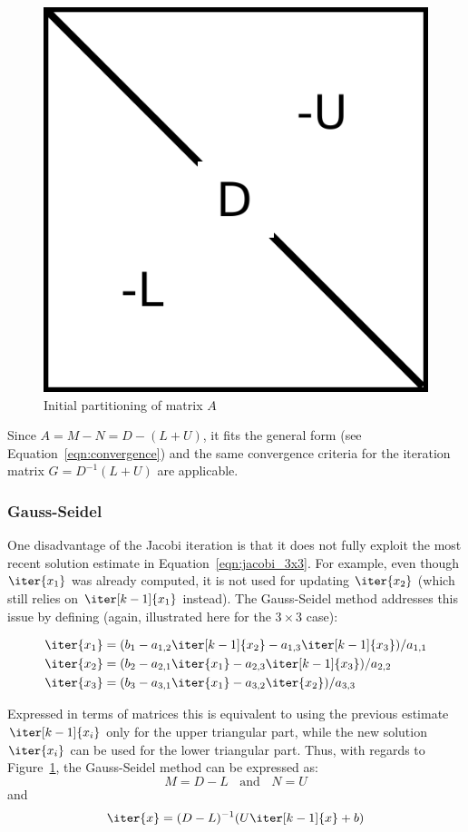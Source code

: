 \begin{figure}[h]
    \centering
    \includegraphics[width=0.4\linewidth]{chapters/3_solvers/3_2_iterative_solvers/figures/Splitting.pdf}
    \caption{Initial partitioning of matrix $A$}
    \label{fig:splitting}
\end{figure}

\noindent Since $A = M -N = D - (L +U)$, it fits the general form (see Equation~\hyperref[eqn:convergence]{\ref{eqn:convergence}}) and the same convergence criteria for the iteration matrix $G=D^{-1}(L+U)$ are applicable.

\subsubsection{Gauss-Seidel}
One disadvantage of the Jacobi iteration is that it does not fully exploit the most recent solution estimate in Equation~\hyperref[eqn:jacobi_3x3]{\ref{eqn:jacobi_3x3}}. For example, even though $\iter{x_1}$ was already computed, it is not used for updating $\iter{x_2}$ (which still relies on $\iter[k-1]{x_1}$ instead). The Gauss-Seidel method addresses this issue by defining (again, illustrated here for the $3 \times 3$ case):

\begin{equation}
\label{eqn:gauss_seidel}
   \begin{aligned}
    \iter{x_1} & =  (b_1 -a_{1,2}\iter[k-1]{x_2} - a_{1,3}\iter[k-1]{x_3})/a_{1,1} \\
    \iter{x_2} & =  (b_2 -a_{2,1}\iter{x_1} - a_{2,3}\iter[k-1]{x_3})/a_{2,2} \\
    \iter{x_3} & =  (b_3 -a_{3,1}\iter{x_1} - a_{3,2}\iter{x_2})/a_{3,3} \\
\end{aligned} 
\end{equation}

\noindent Expressed in terms of matrices this is equivalent to using the previous estimate $\iter[k-1]{x_i}$ only for the upper triangular part, while the new solution $\iter{x_i}$ can be used for the lower triangular part. Thus, with regards to Figure~\hyperref[fig:splitting]{\ref{fig:splitting}}, the Gauss-Seidel method can be expressed as:
\begin{equation}
    M=D-L \;\;\text{ and } \;\; N=U
\end{equation}
\noindent and
\begin{equation}
    \iter{x} = (D-L)^{-1}(U\iter[k-1]{x} +b)
\end{equation}

